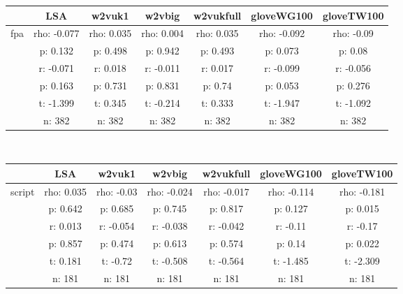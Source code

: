 \documentclass{article}
\begin{document}
\begin{tabular}{ccccccc|}\cline{2-7}
&\multicolumn{1}{|c}{LSA} & w2vuk1 & w2vbig & w2vukfull & gloveWG100 & gloveTW100 \\\hline
\multicolumn{1}{|c|}{\multirow{6}{*}{fpa}} & rho: -0.077 & rho: 0.035 & rho: 0.004 & rho: 0.035 & rho: -0.092 & rho: -0.09 \\
\multicolumn{1}{|c|}{} & p: 0.132 & p: 0.498 & p: 0.942 & p: 0.493 & p: 0.073 & p: 0.08 \\
\multicolumn{1}{|c|}{} & r: -0.071 & r: 0.018 & r: -0.011 & r: 0.017 & r: -0.099 & r: -0.056 \\
\multicolumn{1}{|c|}{} & p: 0.163 & p: 0.731 & p: 0.831 & p: 0.74 & p: 0.053 & p: 0.276 \\
\multicolumn{1}{|c|}{} & t: -1.399 & t: 0.345 & t: -0.214 & t: 0.333 & t: -1.947 & t: -1.092 \\
\multicolumn{1}{|c|}{} & n: 382 & n: 382 & n: 382 & n: 382 & n: 382 & n: 382 \\
\hline
\end{tabular}\\
\begin{tabular}{ccccccc|}\cline{2-7}
&\multicolumn{1}{|c}{LSA} & w2vuk1 & w2vbig & w2vukfull & gloveWG100 & gloveTW100 \\\hline
\multicolumn{1}{|c|}{\multirow{6}{*}{script}} & rho: 0.035 & rho: -0.03 & rho: -0.024 & rho: -0.017 & rho: -0.114 & rho: -0.181 \\
\multicolumn{1}{|c|}{} & p: 0.642 & p: 0.685 & p: 0.745 & p: 0.817 & p: 0.127 & p: 0.015 \\
\multicolumn{1}{|c|}{} & r: 0.013 & r: -0.054 & r: -0.038 & r: -0.042 & r: -0.11 & r: -0.17 \\
\multicolumn{1}{|c|}{} & p: 0.857 & p: 0.474 & p: 0.613 & p: 0.574 & p: 0.14 & p: 0.022 \\
\multicolumn{1}{|c|}{} & t: 0.181 & t: -0.72 & t: -0.508 & t: -0.564 & t: -1.485 & t: -2.309 \\
\multicolumn{1}{|c|}{} & n: 181 & n: 181 & n: 181 & n: 181 & n: 181 & n: 181 \\
\hline
\end{tabular}\\
\end{document}
